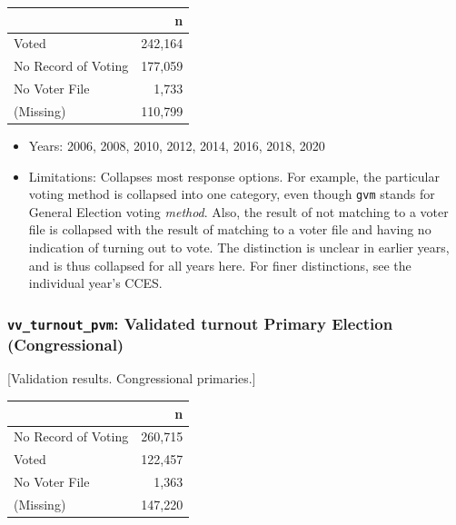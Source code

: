 \documentclass[10pt,article,oneside]{memoir}
\theoremstyle{definition}
\begin{document}
\begin{table}[H]
\centering
\begin{tabular}{lr}
\toprule
 & n\\
\midrule
Voted & 242,164\\
No Record of Voting & 177,059\\
No Voter File & 1,733\\
(Missing) & 110,799\\
\bottomrule
\end{tabular}
\end{table}

\begin{itemize}
\tightlist
\item
  Years: 2006, 2008, 2010, 2012, 2014, 2016, 2018, 2020
\item
  Limitations: Collapses most response options. For example, the
  particular voting method is collapsed into one category, even though
  \texttt{gvm} stands for General Election voting \emph{method}. Also,
  the result of not matching to a voter file is collapsed with the
  result of matching to a voter file and having no indication of turning
  out to vote. The distinction is unclear in earlier years, and is thus
  collapsed for all years here. For finer distinctions, see the
  individual year's CCES.
\end{itemize}

\hypertarget{vv_turnout_pvm-validated-turnout-primary-election-congressional}{%
\subsubsection{\texorpdfstring{\texttt{vv\_turnout\_pvm}: Validated
turnout Primary Election
(Congressional)}{vv\_turnout\_pvm: Validated turnout Primary Election (Congressional)}}\label{vv_turnout_pvm-validated-turnout-primary-election-congressional}}

{[}Validation results. Congressional primaries.{]}

\begin{table}[H]
\centering
\begin{tabular}{lr}
\toprule
 & n\\
\midrule
No Record of Voting & 260,715\\
Voted & 122,457\\
No Voter File & 1,363\\
(Missing) & 147,220\\
\bottomrule
\end{tabular}
\end{table}
\end{document}
